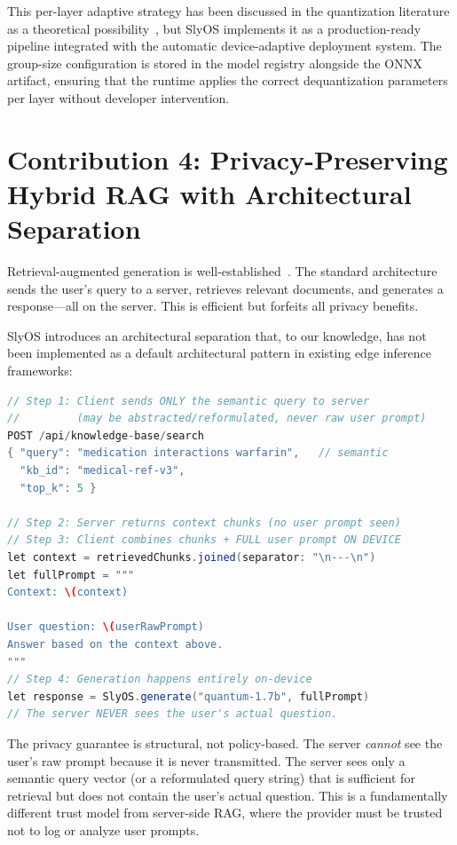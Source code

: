 \documentclass[12pt, letterpaper, twoside]{report}
\begin{document}
This per-layer adaptive strategy has been discussed in the quantization literature as a theoretical possibility~\cite{frantar2022gptq}, but SlyOS implements it as a production-ready pipeline integrated with the automatic device-adaptive deployment system. The group-size configuration is stored in the model registry alongside the ONNX artifact, ensuring that the runtime applies the correct dequantization parameters per layer without developer intervention.

\section{Contribution 4: Privacy-Preserving Hybrid RAG with Architectural Separation}
\label{sec:novel_rag}

Retrieval-augmented generation is well-established~\cite{lewis2020retrieval}. The standard architecture sends the user's query to a server, retrieves relevant documents, and generates a response---all on the server. This is efficient but forfeits all privacy benefits.

SlyOS introduces an architectural separation that, to our knowledge, has not been implemented as a default architectural pattern in existing edge inference frameworks:

\begin{lstlisting}[language=Java, caption={Privacy-preserving hybrid RAG---query goes to server, generation stays on device}]
// Step 1: Client sends ONLY the semantic query to server
//         (may be abstracted/reformulated, never raw user prompt)
POST /api/knowledge-base/search
{ "query": "medication interactions warfarin",   // semantic
  "kb_id": "medical-ref-v3",
  "top_k": 5 }

// Step 2: Server returns context chunks (no user prompt seen)
// Step 3: Client combines chunks + FULL user prompt ON DEVICE
let context = retrievedChunks.joined(separator: "\n---\n")
let fullPrompt = """
Context: \(context)

User question: \(userRawPrompt)
Answer based on the context above.
"""
// Step 4: Generation happens entirely on-device
let response = SlyOS.generate("quantum-1.7b", fullPrompt)
// The server NEVER sees the user's actual question.
\end{lstlisting}

The privacy guarantee is structural, not policy-based. The server \textit{cannot} see the user's raw prompt because it is never transmitted. The server sees only a semantic query vector (or a reformulated query string) that is sufficient for retrieval but does not contain the user's actual question. This is a fundamentally different trust model from server-side RAG, where the provider must be trusted not to log or analyze user prompts.
\end{document}
